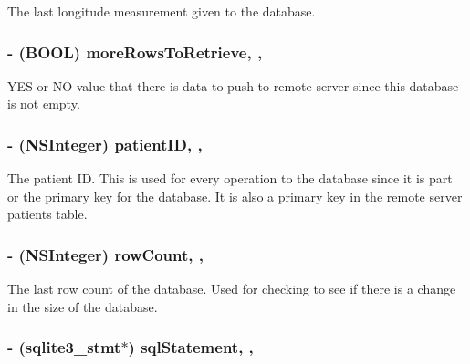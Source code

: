 The last longitude measurement given to the database. \hypertarget{interface_d_b_manager_a921cb5034e1b4f79c6db59a1ce3fd579}{
\subsubsection[{more\-Rows\-To\-Retrieve}]{\setlength{\rightskip}{0pt plus 5cm}-\/ (B\-O\-O\-L) more\-Rows\-To\-Retrieve\hspace{0.3cm}{\ttfamily [read]}, {\ttfamily [write]}, {\ttfamily [atomic]}}}\label{interface_d_b_manager_a921cb5034e1b4f79c6db59a1ce3fd579}
Y\-E\-S or N\-O value that there is data to push to remote server since this database is not empty. \hypertarget{interface_d_b_manager_a7206acae059164df418a2dbfaa7fbb13}{
\subsubsection[{patient\-I\-D}]{\setlength{\rightskip}{0pt plus 5cm}-\/ (N\-S\-Integer) patient\-I\-D\hspace{0.3cm}{\ttfamily [read]}, {\ttfamily [write]}, {\ttfamily [atomic]}}}\label{interface_d_b_manager_a7206acae059164df418a2dbfaa7fbb13}
The patient I\-D. This is used for every operation to the database since it is part or the primary key for the database. It is also a primary key in the remote server patients table. \hypertarget{interface_d_b_manager_a7299e28bee3f75281496adcebb46010b}{
\subsubsection[{row\-Count}]{\setlength{\rightskip}{0pt plus 5cm}-\/ (N\-S\-Integer) row\-Count\hspace{0.3cm}{\ttfamily [read]}, {\ttfamily [write]}, {\ttfamily [atomic]}}}\label{interface_d_b_manager_a7299e28bee3f75281496adcebb46010b}
The last row count of the database. Used for checking to see if there is a change in the size of the database. \hypertarget{interface_d_b_manager_ae714f21433f7593c722b727d2ae9c66a}{
\subsubsection[{sql\-Statement}]{\setlength{\rightskip}{0pt plus 5cm}-\/ (sqlite3\-\_\-stmt$\ast$) sql\-Statement\hspace{0.3cm}{\ttfamily [read]}, {\ttfamily [write]}, {\ttfamily [atomic]}}}\label{interface_d_b_manager_ae714f21433f7593c722b727d2ae9c66a}

